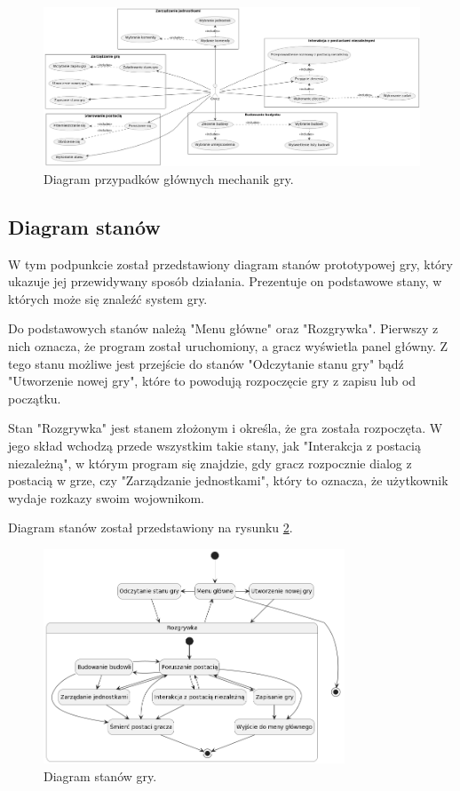 \begin{figure}[!htbp]
    \centering
    \includegraphics[width=1.0\textwidth]{images/diagrams/usecase.jpg}
    \caption{Diagram przypadków głównych mechanik gry.}\label{fig:usecases_d}
\end{figure}
\FloatBarrier

\subsection{Diagram stanów}\label{ss:state}
W tym podpunkcie został przedstawiony diagram stanów prototypowej gry, który ukazuje jej przewidywany sposób działania.
Prezentuje on podstawowe stany, w których może się znaleźć system gry.

Do podstawowych stanów należą "Menu główne" oraz "Rozgrywka". Pierwszy z nich oznacza, że program został uruchomiony, a
gracz wyświetla panel główny. Z tego stanu możliwe jest przejście do stanów "Odczytanie stanu gry" bądź "Utworzenie
nowej gry", które to powodują rozpoczęcie gry z zapisu lub od początku.

Stan "Rozgrywka" jest stanem złożonym i określa, że gra została rozpoczęta. W jego skład wchodzą przede wszystkim takie
stany, jak "Interakcja z postacią niezależną", w którym program się znajdzie, gdy gracz rozpocznie dialog z postacią w grze,
czy "Zarządzanie jednostkami", który to oznacza, że użytkownik wydaje rozkazy swoim wojownikom.

Diagram stanów został przedstawiony na rysunku \ref{fig:states_d}.

\begin{figure}[!htbp]
    \centering
    \includegraphics[width=0.8\textwidth]{images/diagrams/state.jpg}
    \caption{Diagram stanów gry.}\label{fig:states_d}
\end{figure}
\FloatBarrier

